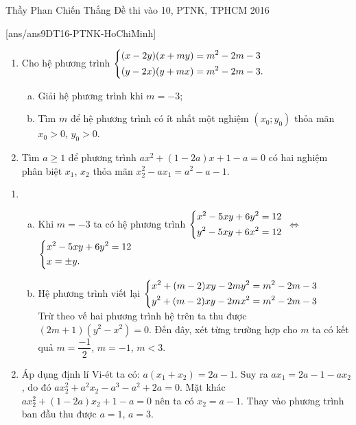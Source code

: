 \begin{name}
{Thầy  Phan Chiến Thắng}
{Đề thi vào 10, PTNK, TPHCM 2016}
\end{name}
\setcounter{ex}{0}
[ans/ans9DT16-PTNK-HoChiMinh]
\begin{ex}%
\hfill
  \begin{enumerate}[1.]
  	\item Cho hệ phương trình $\left\{\begin{aligned}&(x-2y)(x+my)=m^2-2m-3\\&(y-2x)(y+mx)=m^2-2m-3.\end{aligned}\right.$
  
    \begin{enumerate}[a)]
        \item Giải hệ phương trình khi $m=-3$;
        \item Tìm $m$ để hệ phương trình có ít nhất một nghiệm $(x_0;y_0)$ thỏa mãn $x_0>0$, $y_0>0$.
    \end{enumerate}
\item Tìm $a\geq 1$ để phương trình $ax^2+(1-2a)x+1-a=0$ có hai nghiệm phân biệt $x_1$, $x_2$ thỏa mãn $x_2^2-ax_1=a^2-a-1$.
\end{enumerate}
\loigiai
    {
    \begin{enumerate}[1.]
    	\item 
    	\begin{enumerate}[a)]
        \item Khi $m=-3$ ta có hệ phương trình $\left\{\begin{aligned}x^2-5xy+6y^2=12\\ y^2-5xy+6x^2=12\end{aligned}\right.$ $\Leftrightarrow$ $\left\{\begin{aligned}&x^2-5xy+6y^2=12\\ &x=\pm y.\end{aligned}\right.$
        \item Hệ phương trình viết lại $\left\{\begin{aligned}&x^2+(m-2)xy-2my^2=m^2-2m-3\\&y^2+(m-2)xy-2mx^2=m^2-2m-3\end{aligned}\right.$\\
        Trừ theo vế hai phương trình hệ trên ta thu được $(2m+1)(y^2-x^2)=0$. Đến đây, xét từng trường hợp cho $m$ ta có kết quả $m=\dfrac{-1}{2}$, $m=-1$, $m<3$.
        \end{enumerate}
       \item Áp dụng định lí Vi-ét ta có: $a(x_1+x_2)=2a-1$. Suy ra $ax_1=2a-1-ax_2$, do đó $ax_2^2+a^2x_2-a^3-a^2+2a=0$. Mặt khác $ax_2^2+(1-2a)x_2+1-a=0$ nên ta có $x_2=a-1$. Thay vào phương trình ban đầu thu được $a=1$, $a=3$.
    \end{enumerate}
    }
\end{ex}

